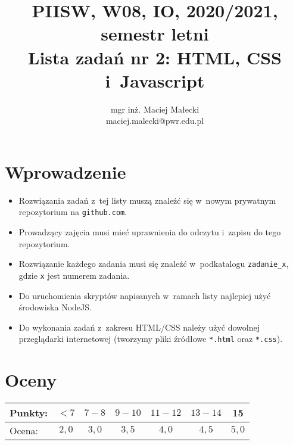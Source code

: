 \documentclass[12pt]{article}
\title{PIISW, W08, IO, 2020/2021, semestr letni\\Lista zadań nr 2: HTML, CSS i~Javascript}
\author{mgr inż. Maciej Małecki\\\small{maciej.malecki@pwr.edu.pl}}
\begin{document}
    \maketitle

    \section*{Wprowadzenie}
    \begin{itemize}
        \item Rozwiązania zadań z~tej listy muszą znaleźć się w~nowym prywatnym repozytorium na \texttt{github.com}.
        \item Prowadzący zajęcia musi mieć uprawnienia do odczytu i~zapisu do tego repozytorium.
        \item Rozwiązanie każdego zadania musi się znaleźć w~podkatalogu \texttt{zadanie\_x}, gdzie \texttt{x} jest numerem zadania.
		\item Do uruchomienia skryptów napisanych w~ramach listy najlepiej użyć środowiska NodeJS.
        \item Do wykonania zadań z~zakresu HTML/CSS należy użyć dowolnej przeglądarki internetowej (tworzymy pliki źródłowe \texttt{*.html} oraz \texttt{*.css}).
    \end{itemize}

    \section*{Oceny}
    \begin{tabular}{|l|c|c|c|c|c|c|}
        \hline
        Punkty: & $<7$ & $7-8$ & $9-10$ & $11-12$ & $13-14$ & 15\\
        \hline
        Ocena:  & $2,0$ & $3,0$ & $3,5$ & $4,0$ & $4,5$ & $5,0$\\
        \hline
    \end{tabular}
\end{document}
